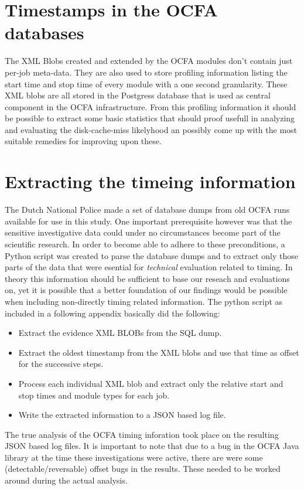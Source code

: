 \section{Timestamps in the OCFA databases}
The XML Blobs created and extended by the OCFA modules don't contain just per-job meta-data. They are also used to store profiling information listing the start time and stop time of every module with a one second granularity.  These XML blobs are all stored in the Postgress database that is used as central component in the OCFA infrastructure. From this profiling information it should be possible to extract some basic statistics that should proof usefull in analyzing and evaluating the disk-cache-miss likelyhood an possibly come up with the most suitable remedies for improving upon these.
\section{Extracting the timeing information}
The Dutch National Police made a set of database dumps from old OCFA runs available for use in this study. One important prerequisite however was that the sensitive investigative data could under no circumstances become part of the scientific research. In order to become able to adhere to these preconditions, a Python script was created to parse the database dumps and to extract only those parts of the data that were esential for \emph{technical} evaluation related to timing. In theory this information should be sufficient to base our reseach and evaluations on, yet it is possible that a better foundation of our findings would be possible when including non-directly timing related information. The python script as included in a following appendix basically did the following:
\begin{itemize}
\item Extract the evidence XML BLOBs from the SQL dump.
\item Extract the oldest timestamp from the XML blobs and use that time as offset for the successive steps.
\item Process each individual XML blob and extract only the relative start and stop times and module types for each job.
\item Write the extracted information to a JSON based log file.
\end{itemize}
The true analysis of the OCFA timing inforation took place on the resulting JSON based log files. It is important to note that due to a bug in the OCFA Java library at the time these investigations were active, there are were some (detectable/reversable) offset bugs in the results. These needed to be worked around during the actual analysis.




